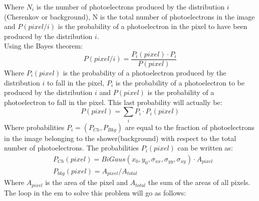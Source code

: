 \documentclass[main.tex]{subfiles}
\begin{document}
Where $N_i$ is the number of photoelectrons produced by the distribution $i$ (Cherenkov or background), N is the total number of photoelectrons in the image and $P(pixel/i)$ is the probability of a photoelectron in the pixel to have been produced by the distribution $i$.\\
Using the Bayes theorem:
\begin{equation}\label{eq:bayes}
  P(pixel/i) = \frac{P_i(pixel) \cdot P_i}{P(pixel)}
\end{equation}
Where $P_i(pixel)$ is the probability of a photoelectron produced by the distribution $i$ to fall in the pixel, $P_i$ is the probability of a photoelectron to be produced by the distribution $i$ and $P(pixel)$ is the probability of a photoelectron to fall in the pixel. This last probability will actually be:
\begin{equation}
P(pixel) = \sum_{i} P_i \cdot P_i(pixel)
\end{equation}
Where probabilities $P_i=(P_{Ch}, P_{Bkg})$ are equal to the fraction of photoelectrons in the image belonging to the shower(background) with respect to the total number of photoelectrons. The probabilities $P_i(pixel)$ can be written as:
\begin{equation}
  \begin{split}
  & P_{Ch}(pixel) = BiGaus(x_{0}, y_{0},\sigma_{xx}, \sigma_{yy}, \sigma_{xy}) \cdot A_{pixel}\\
  & P_{bkg}(pixel) = A_{pixel}/A_{total}
  \end{split}
\end{equation}
Where $A_{pixel}$ is the area of the pixel and $A_{total}$ the sum of the areas of all pixels.\\
The loop in the \gls{em} to solve this problem will go as follows:
\end{document}
